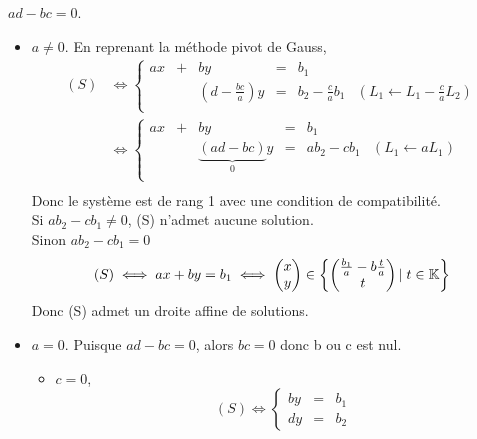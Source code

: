 \documentclass{article}
\renewenvironment{question_kholle}[2][ ]
{
	\subsection{\texorpdfstring{#2}{}}
	\notblank{#1}
	{
		\noindent #1
		\bigbreak
	}
	{}
	\begin{proof}
}
{
	\end{proof}
}
\begin{document}
\begin{question_kholle}
		\item $ad - bc = 0$.
		\begin{itemize}[label=$\bullet$ Supposons]
			\item $a \neq 0$. En reprenant la méthode pivot de Gauss,
			\begin{equation*}
				\begin{aligned}
					(S)
					&\iff \left\{
					\begin{array}{cccccc}
						ax &+& by &=& b_1 \\
						&&\left(d - \frac{bc}{a}\right)y &=& b_2 - \frac{c}{a} b_1 &(L_1 \leftarrow L_1 - \frac{c}{a} L_2) \\
					\end{array}
					\right. \\
					&\iff \left\{
					\begin{array}{cccccc}
						ax &+& by &=& b_1 \\
						&& \underbrace{\left(ad - bc\right)}_0 y &=& a b_2 - c b_1 &(L_1 \leftarrow aL_1) \\
					\end{array}
					\right. \\
				\end{aligned}
			\end{equation*}
			Donc le système est de rang 1 avec une condition de compatibilité. \\
			Si $ab_2 - cb_1 \neq 0$, (S) n'admet aucune solution. \\
			Sinon $ab_2 - cb_1 = 0$
			\begin{equation}
				(S) \iff
				ax + by = b_1 \iff
				\begin{pmatrix} x \\ y \end{pmatrix} \in \left\{
					\begin{pmatrix} \frac{b_1}{a} - b\frac{t}{a} \\ t \end{pmatrix}
					|\; t \in \mathbb K
				\right\}
			\end{equation}
			Donc (S) admet un droite affine de solutions.

			\item $a = 0$. Puisque $ad - bc = 0$, alors $bc = 0$ donc b ou c est nul.

			\begin{itemize}[label=$\bullet$ Si]
				\item $c = 0$,
				\begin{equation*}
					(S) \iff
					\left\{ \begin{array}{ccc}
							by &=& b_1 \\
							dy &=& b_2
					\end{array} \right.
				\end{equation*}


\end{itemize}
\end{itemize}
\end{question_kholle}
\end{document}

